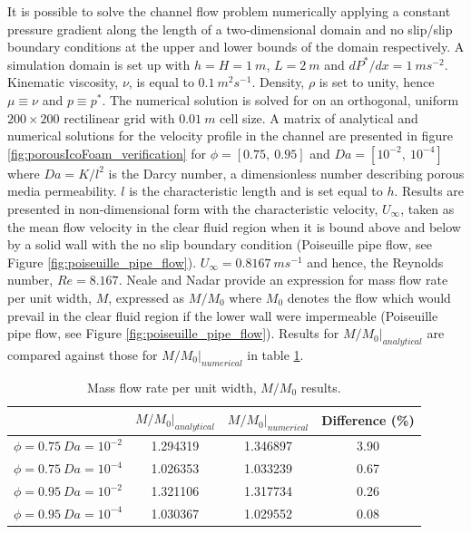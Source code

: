 \documentclass[a4paper,11pt]{report}
\begin{document}
It is possible to solve the channel flow problem numerically applying a constant pressure gradient along the length of a two-dimensional domain and no slip/slip boundary conditions at the upper and lower bounds of the domain respectively. A simulation domain is set up with $h=H=1\ m$, $L=2\ m$ and $dP^*/dx=1\ ms^{-2}$. Kinematic viscosity, $\nu$, is equal to $0.1\ m^{2}s^{-1}$. Density, $\rho$ is set to unity, hence $\mu\equiv\nu$ and $p\equiv p^*$. The numerical solution is solved for on an orthogonal, uniform $200\times200$ rectilinear grid with $0.01\ m$ cell size. A matrix of analytical and numerical solutions for the velocity profile in the channel are presented in figure \ref{fig:porousIcoFoam_verification} for $\phi=[0.75,\ 0.95]$ and $Da=[10^{-2},\ 10^{-4}]$ where $Da=K/l^{2}$ is the Darcy number, a dimensionless number describing porous media permeability. $l$ is the characteristic length and is set equal to $h$. Results are presented in non-dimensional form with the characteristic velocity, $U_{\infty}$, taken as the mean flow velocity in the clear fluid region when it is bound above and below by a solid wall with the no slip boundary condition (Poiseuille pipe flow, see Figure \ref{fig:poiseuille_pipe_flow}). $U_{\infty}=0.8167\ ms^{-1}$ and hence, the Reynolds number, $Re=8.167$. Neale and Nadar \cite{NealeNadar1974} provide an expression for mass flow rate per unit width, $M$, expressed as $M/M_0$ where $M_0$ denotes the flow which would prevail in the clear fluid region if the lower wall were impermeable (Poiseuille pipe flow, see Figure \ref{fig:poiseuille_pipe_flow}). Results for $M/M_0|_{analytical}$ are compared against those for $M/M_0|_{numerical}$ in table \ref{table:M_M0}.
\begin{table}[ht]
\centering
\begin{tabular}{ c | c | c | c }
        & $M/M_0|_{analytical}$ & $M/M_0|_{numerical}$ & Difference (\%) \\
    \hline\hline
    $\phi=0.75\ Da=10^{-2}$ & 1.294319 & 1.346897 & 3.90\\
    \hline
    $\phi=0.75\ Da=10^{-4}$ & 1.026353 & 1.033239 & 0.67\\
    \hline
    $\phi=0.95\ Da=10^{-2}$ & 1.321106 & 1.317734 & 0.26\\
    \hline
    $\phi=0.95\ Da=10^{-4}$ & 1.030367 & 1.029552 & 0.08\\
\end{tabular}
\caption{Mass flow rate per unit width, $M/M_0$ results.}
\label{table:M_M0}
\end{table}\\
\end{document}
